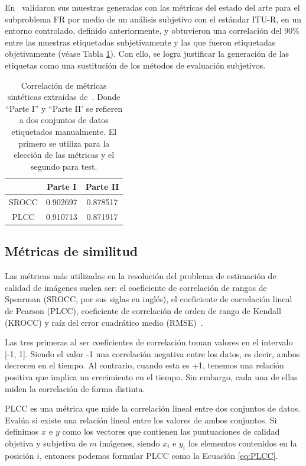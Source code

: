 En~\cite{ResSCNN} validaron sus muestras generadas con las métricas del estado del arte 
para el subproblema FR por medio de un análisis subjetivo con el estándar ITU-R, en
un entorno controlado, definido anteriormente, y obtuvieron una correlación del 
90\% entre las muestras 
etiquetadas subjetivamente y las que fueron etiquetadas objetivamente (véase Tabla \ref{tab:PseudoCorr}).
Con ello, se logra justificar la generación de las etiquetas como una sustitución 
de los métodos de evaluación subjetivos. 

\begin{table}[H]
  \centering 
  \scriptsize
  \begin{tabular}{|c|c|c|}
    \hline
    \rowcolor[HTML]{FFC702}
     & \textbf{Parte I} & \textbf{Parte II} \\
    \hline 
    SROCC & 0.902697 & 0.878517\\
    \hline
    PLCC & 0.910713 & 0.871917\\
    \hline
  \end{tabular}
  \caption[Correlación de métricas sintéticas.]{
  Correlación de métricas sintéticas extraídas de~\cite{ResSCNN}.
  Donde ``Parte I'' y ``Parte II' se refieren a dos conjuntos de datos etiquetados 
  manualmente. El primero se utiliza para la elección de las métricas y el segundo 
  para test.
}
  \label{tab:PseudoCorr}
\end{table}

\subsection{Métricas de similitud}
\label{sec:Metricas}
Las métricas más utilizadas en la resolución del problema de estimación de calidad 
de imágenes suelen ser: el coeficiente de correlación de rangos de Spearman (SROCC, 
por sus siglas en inglés), el coeficiente de correlación lineal de Pearson (PLCC), coeficiente de correlación de orden de rango de Kendall (KROCC)
y raíz del error cuadrático medio (RMSE)~\cite{VisualMedicalQualityBook}.

Las tres primeras al ser coeficientes de correlación toman valores en el intervalo 
[-1, 1]. Siendo el valor -1 una correlación negativa entre los datos, es decir,
ambos decrecen en el tiempo. Al contrario, cuando esta es +1, tenemos una relación 
positiva que implica un crecimiento en el tiempo. Sin embargo, cada una de ellas 
miden la correlación de forma distinta. 

PLCC es una métrica que mide la correlación lineal entre dos conjuntos de datos.
Evalúa si existe una relación lineal entre los valores de ambos conjuntos.
Si definimos $x$ e $y$ como los vectores que contienen las puntuaciones de 
calidad objetiva y subjetiva de $m$ imágenes, siendo $x_i$ e $y_i$ 
los elementos contenidos en la posición $i$, entonces podemos formular 
PLCC como la Ecuación \eqref{eq:PLCC}.

